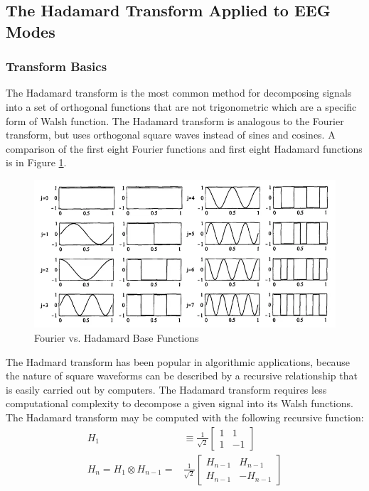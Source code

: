 \subsection{The Hadamard Transform Applied to EEG Modes}
\subsubsection{Transform Basics}
\label{sec:basics}
The Hadamard transform is the most common method for decomposing signals into a set of orthogonal functions that are not trigonometric which are a specific form of Walsh function. The Hadamard transform is analogous to the Fourier transform, but uses orthogonal square waves instead of sines and cosines. A comparison of the first eight Fourier functions and first eight Hadamard functions is in Figure \ref{fig:hf_comp}.
\begin{figure}[]
    \centering
    \includegraphics[scale=0.5]{../../../figures/func_comp.png} 
    \caption{Fourier vs. Hadamard Base Functions}
    \label{fig:hf_comp}
\end{figure}
The Hadmard transform has been popular in algorithmic applications, because the nature of square waveforms can be described by a recursive relationship that is easily carried out by computers. The Hadamard transform requires less computational complexity to decompose a given signal into its Walsh functions. The Hadamard transform may be computed with the following recursive function:
\begin{align}
H_1 &\equiv \frac{1}{\sqrt{2}}\begin{bmatrix}
1 & 1\\ 1 & -1
\end{bmatrix} \label{eqn:hada1} \\
H_n=H_1 \otimes H_{n-1}=&\frac{1}{\sqrt{2}}\begin{bmatrix}
H_{n-1} & H_{n-1}\\ H_{n-1} & -H_{n-1}
\end{bmatrix}
\end{align}
